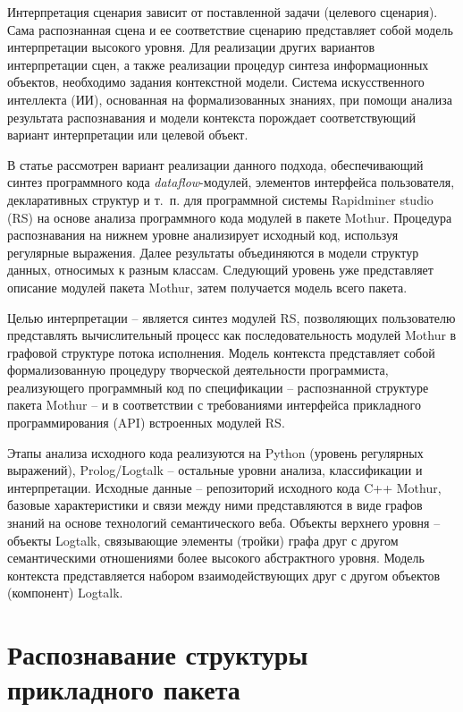 \documentclass[12pt]{article}
\begin{document}
Интерпретация сценария зависит от поставленной задачи (целевого сценария). Сама распознанная сцена и ее соответствие сценарию представляет собой модель интерпретации высокого уровня. Для реализации других вариантов интерпретации сцен, а также реализации процедур синтеза информационных объектов, необходимо задания контекстной модели. Система искусственного интеллекта (ИИ), основанная на формализованных знаниях, при помощи анализа результата распознавания и модели контекста порождает соответствующий вариант интерпретации или целевой объект.

В статье рассмотрен вариант реализации данного подхода, обеспечивающий синтез программного кода \emph{dataflow}-модулей, элементов интерфейса пользователя, декларативных структур и т.~п. для программной системы Rapidminer studio (RS) на основе анализа программного кода модулей в пакете Mothur. Процедура распознавания на нижнем уровне анализирует исходный код, используя регулярные выражения. Далее результаты объединяются в модели структур данных, относимых к разным классам.  Следующий уровень уже представляет описание модулей пакета Mothur, затем получается модель всего пакета.

Целью интерпретации -- является синтез модулей RS, позволяющих пользователю представлять вычислительный процесс как последовательность модулей Mothur в графовой структуре потока исполнения. Модель контекста представляет собой формализованную процедуру творческой деятельности программиста, реализующего программный код по спецификации -- распознанной структуре пакета Mothur -- и в соответствии с требованиями интерфейса прикладного программирования (API) встроенных модулей RS.

Этапы анализа исходного кода реализуются на Python (уровень регулярных выражений), Prolog/Logtalk \cite{logtalk} -- остальные уровни анализа, классификации и интерпретации. Исходные данные -- репозиторий исходного кода C++ Mothur, базовые характеристики и связи между ними представляются в виде графов знаний на основе технологий семантического веба. Объекты верхнего уровня -- объекты Logtalk, связывающие элементы (тройки) графа друг с другом семантическими отношениями более высокого абстрактного уровня. Модель контекста представляется набором взаимодействующих друг с другом объектов (компонент) Logtalk.

\section{Распознавание структуры прикладного пакета}
\end{document}
